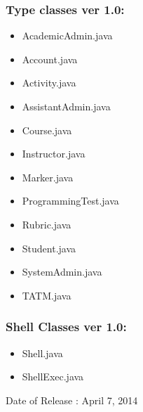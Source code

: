 \documentclass{article}
\begin{document}
\subsubsection{Type classes ver 1.0:}
\begin{itemize}
\item AcademicAdmin.java
\item Account.java
\item Activity.java
\item AssistantAdmin.java
\item Course.java
\item Instructor.java
\item Marker.java
\item ProgrammingTest.java
\item Rubric.java
\item Student.java
\item SystemAdmin.java
\item TATM.java
\end{itemize}

\subsubsection{Shell Classes ver 1.0:}
\begin{itemize}
\item Shell.java
\item ShellExec.java
\end{itemize}

Date of Release : April 7, 2014
\end{document}
